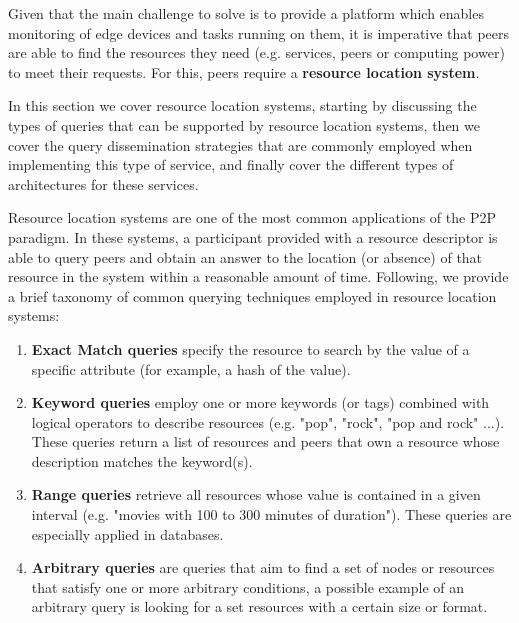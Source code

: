 

Given that the main challenge to solve is to provide a platform which enables monitoring of edge devices and tasks running on them, it is imperative that peers are able to find the resources they need (e.g. services, peers or computing power) to meet their requests. For this, peers require a \textbf{resource location system}.

In this section we cover resource location systems, starting by discussing the types of queries that can be supported by resource location systems, then we cover the query dissemination strategies that are commonly employed when implementing this type of service, and finally cover the different types of architectures for these services.

Resource location systems are one of the most common applications of the P2P paradigm. In these systems, a participant provided with a resource descriptor is able to query peers and obtain an answer to the location (or absence) of that resource in the system within a reasonable amount of time. Following, we provide a brief taxonomy of common querying techniques employed in resource location systems:

\begin{enumerate}
    \item \textbf{Exact Match queries} specify the resource to search by the value of a specific attribute (for example, a hash of the value).

    \item \textbf{Keyword queries} employ one or more keywords (or tags) combined with logical operators to describe resources (e.g. "pop", "rock", "pop and rock" ...). These queries return a list of resources and peers that own a resource whose description matches the keyword(s).
    
    \item \textbf{Range queries} retrieve all resources whose value is contained in a given interval (e.g. "movies with 100 to 300 minutes of duration"). These queries are especially applied in databases.
    
    \item \textbf{Arbitrary queries} are queries that aim to find a set of nodes or resources that satisfy one or more arbitrary conditions, a possible example of an arbitrary query is looking for a set resources with a certain size or format.
    
\end{enumerate}

